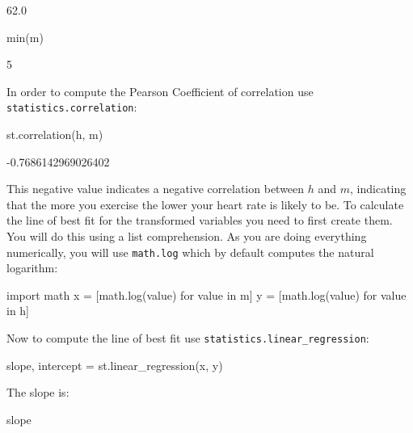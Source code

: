 \begin{raw}
62.0
\end{raw}







\begin{pyin}
min(m)
\end{pyin}





\begin{raw}
5
\end{raw}





In order to compute the Pearson Coefficient of correlation use
\texttt{statistics.correlation}:




\begin{pyin}
st.correlation(h, m)
\end{pyin}





\begin{raw}
-0.7686142969026402
\end{raw}





This negative value indicates a negative correlation between \(h\) and \(m\),
indicating that the more you exercise the lower your heart rate is likely to be.
To calculate the line of best fit for the transformed variables you need to first
create them. You will do this using a list comprehension. As you are doing
everything numerically, you will use \texttt{math.log} which by default computes the
natural logarithm:




\begin{pyin}
import math
x = [math.log(value) for value in m]
y = [math.log(value) for value in h]
\end{pyin}

Now to compute the line of best fit use \texttt{statistics.linear\_regression}:




\begin{pyin}
slope, intercept = st.linear_regression(x, y)
\end{pyin}

The slope is:

\begin{pyin}
slope
\end{pyin}





